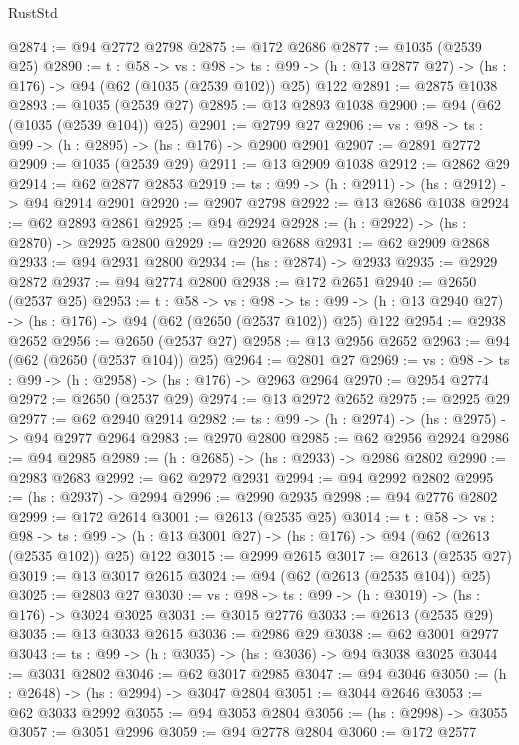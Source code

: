 \begin{lexlean}{RustStd}
\begin{coremodule}
{\begin{coremodule}
{{{{{{{{{{{@2874 := @94 @2772 @2798
@2875 := @172 @2686
@2877 := @1035 (@2539 @25)
@2890 := {t : @58} ->
  {vs : @98} ->
  {ts : @99} -> (h : @13 @2877 @27) -> (hs : @176) -> @94 (@62 (@1035 (@2539 @102)) @25) @122
@2891 := @2875 @1038
@2893 := @1035 (@2539 @27)
@2895 := @13 @2893 @1038
@2900 := @94 (@62 (@1035 (@2539 @104)) @25)
@2901 := @2799 @27
@2906 := {vs : @98} -> {ts : @99} -> (h : @2895) -> (hs : @176) -> @2900 @2901
@2907 := @2891 @2772
@2909 := @1035 (@2539 @29)
@2911 := @13 @2909 @1038
@2912 := @2862 @29
@2914 := @62 @2877 @2853
@2919 := {ts : @99} -> (h : @2911) -> (hs : @2912) -> @94 @2914 @2901
@2920 := @2907 @2798
@2922 := @13 @2686 @1038
@2924 := @62 @2893 @2861
@2925 := @94 @2924
@2928 := (h : @2922) -> (hs : @2870) -> @2925 @2800
@2929 := @2920 @2688
@2931 := @62 @2909 @2868
@2933 := @94 @2931 @2800
@2934 := (hs : @2874) -> @2933
@2935 := @2929 @2872
@2937 := @94 @2774 @2800
@2938 := @172 @2651
@2940 := @2650 (@2537 @25)
@2953 := {t : @58} ->
  {vs : @98} ->
  {ts : @99} -> (h : @13 @2940 @27) -> (hs : @176) -> @94 (@62 (@2650 (@2537 @102)) @25) @122
@2954 := @2938 @2652
@2956 := @2650 (@2537 @27)
@2958 := @13 @2956 @2652
@2963 := @94 (@62 (@2650 (@2537 @104)) @25)
@2964 := @2801 @27
@2969 := {vs : @98} -> {ts : @99} -> (h : @2958) -> (hs : @176) -> @2963 @2964
@2970 := @2954 @2774
@2972 := @2650 (@2537 @29)
@2974 := @13 @2972 @2652
@2975 := @2925 @29
@2977 := @62 @2940 @2914
@2982 := {ts : @99} -> (h : @2974) -> (hs : @2975) -> @94 @2977 @2964
@2983 := @2970 @2800
@2985 := @62 @2956 @2924
@2986 := @94 @2985
@2989 := (h : @2685) -> (hs : @2933) -> @2986 @2802
@2990 := @2983 @2683
@2992 := @62 @2972 @2931
@2994 := @94 @2992 @2802
@2995 := (hs : @2937) -> @2994
@2996 := @2990 @2935
@2998 := @94 @2776 @2802
@2999 := @172 @2614
@3001 := @2613 (@2535 @25)
@3014 := {t : @58} ->
  {vs : @98} ->
  {ts : @99} -> (h : @13 @3001 @27) -> (hs : @176) -> @94 (@62 (@2613 (@2535 @102)) @25) @122
@3015 := @2999 @2615
@3017 := @2613 (@2535 @27)
@3019 := @13 @3017 @2615
@3024 := @94 (@62 (@2613 (@2535 @104)) @25)
@3025 := @2803 @27
@3030 := {vs : @98} -> {ts : @99} -> (h : @3019) -> (hs : @176) -> @3024 @3025
@3031 := @3015 @2776
@3033 := @2613 (@2535 @29)
@3035 := @13 @3033 @2615
@3036 := @2986 @29
@3038 := @62 @3001 @2977
@3043 := {ts : @99} -> (h : @3035) -> (hs : @3036) -> @94 @3038 @3025
@3044 := @3031 @2802
@3046 := @62 @3017 @2985
@3047 := @94 @3046
@3050 := (h : @2648) -> (hs : @2994) -> @3047 @2804
@3051 := @3044 @2646
@3053 := @62 @3033 @2992
@3055 := @94 @3053 @2804
@3056 := (hs : @2998) -> @3055
@3057 := @3051 @2996
@3059 := @94 @2778 @2804
@3060 := @172 @2577
}}}}}}}}}}}
\end{coremodule}}
\end{coremodule}
\end{lexlean}
